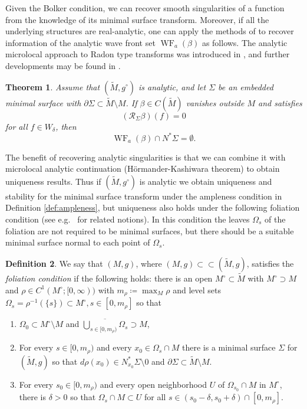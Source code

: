\documentclass[11pt]{amsart}
\newtheorem{Theorem}{Theorem}[section]
\theoremstyle{definition}
\newtheorem{Definition}[Theorem]{Definition}
\numberwithin{equation}{section}
\newcommand{\ol}[1]{\overline{#1}}
\newcommand{\p}{\partial}
\begin{document}
Given the Bolker condition, we can recover smooth singularities of a function from the knowledge of its minimal surface transform. Moreover, if all the underlying structures are real-analytic, one can apply the methods of \cite{MST} to recover information of the analytic wave front set $\operatorname{WF}_a(\beta)$ as follows. The analytic microlocal approach to Radon type transforms was introduced in \cite{zbMATH04052264}, and further developments may be found in \cite{zbMATH02199899, zbMATH05257675, zbMATH05638442, zbMATH06756133, MST, bAFIO}.

\begin{Theorem}\label{thm:integral_transform_WF}
	Assume that $(\widetilde M,{{g}^\circ})$ is analytic, and let $\Sigma$ be an embedded minimal surface with $\p \Sigma \subset \widetilde{M} \setminus M$. If $\beta \in C(\widetilde{M})$ vanishes outside $M$ and satisfies 
	\[
	 (\mathcal{R}_{\Sigma} \beta)(f) = 0
	\] 
    for all $f \in W_{\delta}$, then  
\[
\operatorname{WF}_a(\beta) \cap N^* \Sigma = \emptyset.
\] 
\end{Theorem}

The benefit of recovering analytic singularities is that we can combine it with microlocal analytic continuation (H\"ormander-Kashiwara theorem) to obtain uniqueness results. Thus if $(\widetilde M,{{g}^\circ})$ is analytic we obtain uniqueness and stability for the minimal surface transform under the ampleness condition in Definition \ref{def:ampleness}, but uniqueness also holds under the following foliation condition (see e.g.\ \cite{zbMATH06606440, zbMATH07155016, MST} for related notions). In this condition the leaves $\Omega_s$ of the foliation are not required to be minimal surfaces, but there should be a suitable minimal surface normal to each point of $\Omega_s$.

\begin{Definition}\label{def:fol_intro}
	We say that $(M,g)$, where $(M,g) \subset \subset (\widetilde{M},g)$, satisfies the \emph{foliation condition} if the following holds: there is an open $M^\circ \subset \widetilde{M}$ with $M^\circ\supset M$ and $\rho\in C^1(M^\circ;[0,\infty))$ with $m_\rho \coloneqq \max_{M} \rho$ and level sets $\Omega_s = \rho^{-1}(\{s\}) \subset M^\circ, s\in [0,m_\rho]$ so that 
	\begin{enumerate}
	\item $\Omega_0 \subset M^\circ \setminus M$ and $\ol{\bigcup_{s\in [0,m_\rho)} \Omega_s} \supset M$,
	\item For every $s \in [0,m_\rho)$ and every $x_0 \in \Omega_s \cap M$ there is a minimal surface $\Sigma$ for $(\widetilde{M},{g})$ %
so that $d\rho(x_0)\in N^\ast_{x_0} \Sigma\setminus 0$ and $\p \Sigma \subset \widetilde{M} \setminus M$. %
	\item For every $s_0\in [0,m_\rho)$ and every open neighborhood $U$ of $\Omega_{s_0}\cap M$ in $M^\circ$, there is $\delta>0$ so that $\Omega_{s}\cap M \subset U$ for all $s\in (s_0-\delta,s_0+\delta)\cap [0,m_\rho]$.
	\end{enumerate}
\end{Definition}
\end{document}
